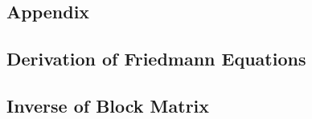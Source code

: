 \begin{appendices}
\chapter*{Appendix}
\section{Derivation of Friedmann Equations}
\lipsum[1-3]

\section{Inverse of Block Matrix}
\lipsum[1-2]

\end{appendices}